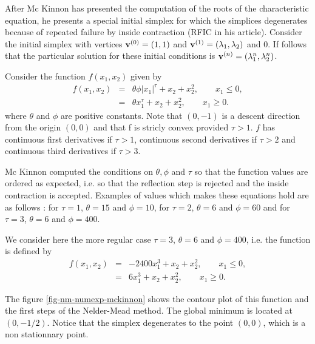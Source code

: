 After Mc Kinnon has presented the computation of the roots of the 
characteristic equation, he presents a special initial simplex 
for which the simplices degenerates because of repeated failure by inside 
contraction (RFIC in his article). Consider the initial simplex with
vertices $\mathbf{v}^{(0)} = (1,1)$ and $\mathbf{v}^{(1)} = (\lambda_1,\lambda_2)$ and 
$0$. If follows that the particular solution for these initial 
conditions is $\mathbf{v}^{(n)} = (\lambda_1^n,\lambda_2^n)$.

Consider the function $f(x_1,x_2)$ given by 
\begin{eqnarray}
\label{mckinnon-function}
f(x_1,x_2) &=& \theta \phi |x_1|^\tau + x_2 + x_2^2, \qquad x_1\leq 0,\\
&=&\theta x_1^\tau + x_2 + x_2^2, \qquad x_1\geq 0.
\end{eqnarray}
where $\theta$ and $\phi$ are positive constants. Note that $(0,-1)$
is a descent direction from the origin $(0,0)$ and that f is stricly convex 
provided $\tau>1$. $f$ has continuous first derivatives if $\tau>1$, continuous second 
derivatives if $\tau>2$ and continuous third derivatives if $\tau>3$.

Mc Kinnon computed the conditions on $\theta,\phi$ and $\tau$
so that the function values are ordered as expected, i.e. so that the 
reflection step is rejected and the inside contraction is accepted.
Examples of values which makes these equations hold are as follows :
for $\tau=1$, $\theta=15$ and $\phi = 10$, 
for $\tau=2$, $\theta=6$ and $\phi = 60$ and
for $\tau=3$, $\theta=6$ and $\phi = 400$.

We consider here the more regular case $\tau=3$, $\theta=6$
and $\phi = 400$, i.e. the function is defined by 
\begin{eqnarray}
\label{mckinnon-function3}
f(x_1,x_2) &=& - 2400 x_1^3 + x_2 + x_2^2, \qquad x_1\leq 0, \\
&=& 6 x_1^3 + x_2 + x_2^2, \qquad x_1\geq 0.
\end{eqnarray}

The figure \ref{fig-nm-numexp-mckinnon} shows the contour plot of this function and the first 
steps of the Nelder-Mead method.
The global minimum is located at $(0,-1/2)$.
Notice that the simplex degenerates to the
point $(0,0)$, which is a non stationnary point.

